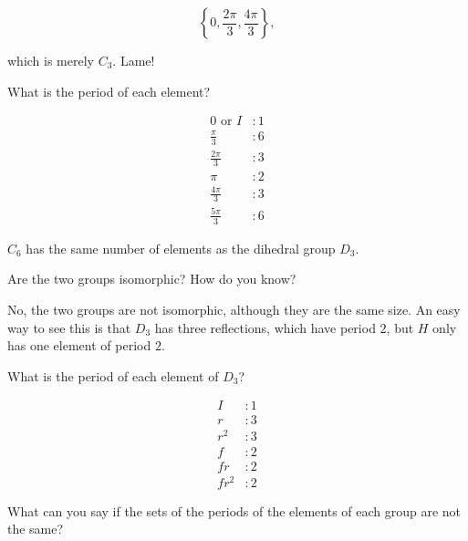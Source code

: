 \documentclass[../key.tex]{subfiles}
\begin{document}
$$\left\{0,\frac{2\pi}{3},\frac{4\pi}{3}\right\},$$

\noindent which is merely $C_3$. Lame!

\begin{inner_problem}
\item What is the period of each element?
\end{inner_problem}

\vspace*{-\baselineskip}

\begin{align*}
0\text{ or }I &: 1 \\
\frac{\pi}{3} &: 6 \\
\frac{2\pi}{3} &: 3 \\
\pi &: 2 \\
\frac{4\pi}{3} &: 3 \\
\frac{5\pi}{3} &: 6
\end{align*}

\begin{outer_problem}
\item $C_6$ has the same number of elements as the dihedral group $D_3$.
\end{outer_problem}

\begin{inner_problem}[start=1]
\item Are the two groups isomorphic? How do you know?
\end{inner_problem}

\noindent No, the two groups are not isomorphic, although they are the same size. An easy way to see this is that $D_3$ has three reflections, which have period $2$, but $H$ only has one element of period $2$.

\begin{inner_problem}
\item What is the period of each element of $D_3$?
\end{inner_problem}

\vspace*{-\baselineskip}

\begin{align*}
I &: 1 \\
r &: 3 \\
r^2  &: 3 \\
f &: 2 \\
fr &: 2 \\
fr^2 &: 2
\end{align*}

\begin{inner_problem}
\item What can you say if the sets of the periods of the elements of each group are not the same?
\end{inner_problem}
\end{document}
